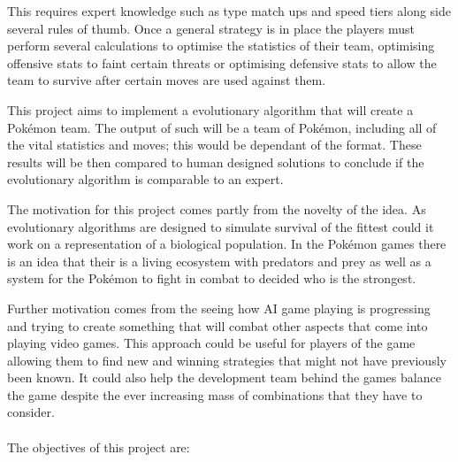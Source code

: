 \documentclass[a4paper]{article}
\newcommand{\Pokemon}{Pok\'{e}mon}
\begin{document}
This requires expert knowledge such as type match ups and speed tiers along side several rules of thumb.
Once a general strategy is in place the players must perform several calculations to optimise the statistics of their team, optimising offensive stats to faint certain threats or optimising defensive stats to allow the team to survive after certain moves are used against them.
\\ \par
This project aims to implement a evolutionary algorithm that will create a \Pokemon{} team.
The output of such will be a team of \Pokemon{}, including all of the vital statistics and moves; this would be dependant of the format.
These results will be then compared to human designed solutions to conclude if the evolutionary algorithm is comparable to an expert.
\\ \par
The motivation for this project comes partly from the novelty of the idea.
As evolutionary algorithms are designed to simulate survival of the fittest could it work on a representation of a biological population.
In the \Pokemon{} games there is an idea that their is a living ecosystem with predators and prey as well as a system for the \Pokemon{} to fight in combat to decided who is the strongest.
\par
Further motivation comes from the seeing how AI game playing is progressing and trying to create something that will combat other aspects that come into playing video games.
This approach could be useful for players of the game allowing them to find new and winning strategies that might not have previously been known.
It could also help the development team behind the games balance the game despite the ever increasing mass of combinations that they have to consider.
\\ \\The objectives of this project are:
\end{document}
